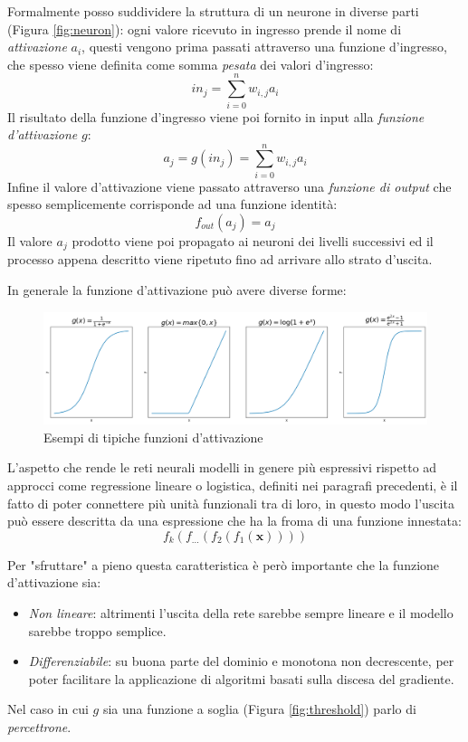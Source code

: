 \documentclass[../../main.tex]{subfiles}
\begin{document}
Formalmente posso suddividere la struttura di un neurone in diverse parti (Figura \ref{fig:neuron}): ogni valore ricevuto in ingresso prende il nome di \textit{attivazione} $a_i$, questi vengono prima passati attraverso una funzione d'ingresso, che spesso viene definita come somma \textit{pesata} dei valori d'ingresso:
\[in_j = \sum_{i=0}^n {w_{i,j} a_i}\]
Il risultato della funzione d'ingresso viene poi fornito in input alla \textit{funzione d'attivazione} $g$:
\[a_j = g(in_j) = \sum_{i=0}^n {w_{i,j} a_i}\]
Infine il valore d'attivazione viene passato attraverso una \textit{funzione di output} che spesso semplicemente corrisponde ad una funzione identità:
\[f_{out}(a_j) = a_j\]
Il valore $a_j$ prodotto viene poi propagato ai neuroni dei livelli successivi ed il processo appena descritto viene ripetuto fino ad arrivare allo strato d'uscita.

In generale la funzione d'attivazione può avere diverse forme:

\begin{figure}[H]
    \centering
    \includegraphics[width=\textwidth]{immagini/4_2/activation_func.png}
    \caption{Esempi di tipiche funzioni d'attivazione}
    \label{fig:activations}
\end{figure}

L'aspetto che rende le reti neurali modelli in genere più espressivi rispetto ad approcci come regressione lineare o logistica, definiti nei paragrafi precedenti, è il fatto di poter connettere più unità funzionali tra di loro, in questo modo l'uscita può essere descritta da una espressione che ha la froma di una funzione innestata:
\[f_k\left(f_{\dots}\left(f_2\left(f_1(\boldsymbol{x})\right)\right)\right)\]

Per "sfruttare" a pieno questa caratteristica è però importante che la funzione d'attivazione sia:
\begin{itemize}
    \item \textit{Non lineare}: altrimenti l’uscita della rete sarebbe sempre lineare e il modello sarebbe troppo semplice.
    \item \textit{Differenziabile}: su buona parte del dominio e monotona non decrescente, per poter facilitare la applicazione di algoritmi basati sulla discesa del gradiente.
\end{itemize}
Nel caso in cui $g$ sia una funzione a soglia (Figura \ref{fig:threshold}) parlo di \textit{percettrone}.
\end{document}
